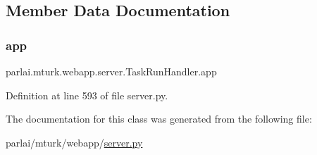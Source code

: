 \subsection{Member Data Documentation}
\mbox{\label{classparlai_1_1mturk_1_1webapp_1_1server_1_1TaskRunHandler_ae9e57d3ffed2fe707e9b1b041e65c2b7}} 
\subsubsection{\texorpdfstring{app}{app}}
{\footnotesize\ttfamily parlai.\+mturk.\+webapp.\+server.\+Task\+Run\+Handler.\+app}



Definition at line 593 of file server.\+py.



The documentation for this class was generated from the following file\+:\begin{DoxyCompactItemize}
\item 
parlai/mturk/webapp/\hyperlink{server_8py}{server.\+py}\end{DoxyCompactItemize}
